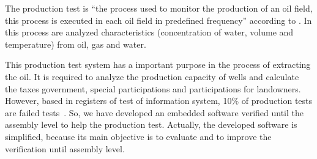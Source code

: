 \documentclass[11pt]{article} %
\begin{document}


The production test is ``the process used to  monitor the production of an oil field, this process is executed
in each oil field in predefined frequency'' according to \cite{LAUT_SERGIO}. In
this process are analyzed characteristics (concentration of water, volume and temperature) from oil, gas and water.



This production test system has a important purpose in the process of extracting
the oil. It is required to analyze the production capacity of wells and calculate
the taxes government, special participations and participations for landowners.
However, based in registers of test of information system, 10\% of production
tests are failed tests~\cite{LAUT_SERGIO}. So, we have developed an embedded
software verified until the assembly level to help the production test. Actually,
the developed software is simplified, because its main objective is to evaluate
and to improve the verification until assembly level.



\end{document}
